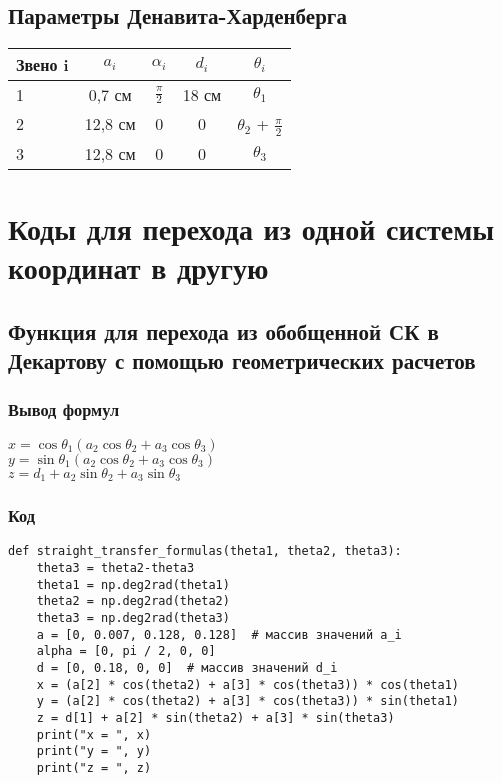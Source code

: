 \documentclass{article}
\begin{document}
\subsection*{Параметры Денавита-Харденберга}
\begin{tabular}{|l||c|c|c|c|}
\hline
Звено i & $a_i$ & $\alpha_i$ & $d_i$ & $\theta_i$\\
\hline
\hline
1 & 0,7 см & $\frac{\pi}2$ & 18 см & $\theta_1$  \\ \hline
2 & 12,8 см & 0 & 0 & $\theta_2$ + $\frac{\pi}2$ \\ \hline
3 & 12,8 см & 0 & 0 & $\theta_3$\\
\hline
\end{tabular}

\section{Коды для перехода из одной системы координат в другую}
\subsection{Функция для перехода из обобщенной СК в Декартову с помощью геометрических расчетов}
\subsubsection*{Вывод формул}
$x = \cos{\theta_1}(a_2\cos{\theta_2} + a_3\cos{\theta_3})$ \\
$y = \sin{\theta_1}(a_2\cos{\theta_2} + a_3\cos{\theta_3})$ \\
$z = d_1 + a_2\sin{\theta_2} + a_3\sin{\theta_3}$
\subsubsection*{Код}
\begin{verbatim}
def straight_transfer_formulas(theta1, theta2, theta3):
    theta3 = theta2-theta3
    theta1 = np.deg2rad(theta1)
    theta2 = np.deg2rad(theta2)
    theta3 = np.deg2rad(theta3)
    a = [0, 0.007, 0.128, 0.128]  # массив значений a_i
    alpha = [0, pi / 2, 0, 0]
    d = [0, 0.18, 0, 0]  # массив значений d_i
    x = (a[2] * cos(theta2) + a[3] * cos(theta3)) * cos(theta1)
    y = (a[2] * cos(theta2) + a[3] * cos(theta3)) * sin(theta1)
    z = d[1] + a[2] * sin(theta2) + a[3] * sin(theta3)
    print("x = ", x)
    print("y = ", y)
    print("z = ", z)

\end{verbatim}
\end{document}
